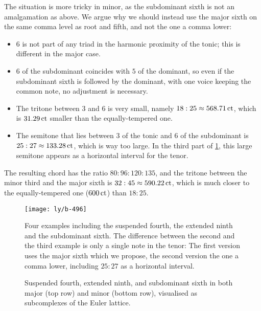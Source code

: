 \documentclass[british,11pt]{scrartcl}
\begin{document}
The situation is more tricky in minor, as the subdominant sixth is not an
amalgamation as above. We argue why we should instead use the major sixth
on the same comma level as root and fifth, and not the one a comma lower:
\begin{itemize}
\item \naturalm $6$ is not part of any triad in the harmonic proximity of the
  tonic; this is different in the major case.
\item \natural $6$ of the subdominant coincides with \natural $5$ of the
  dominant, so even
  if the subdominant sixth is followed by the dominant, with one voice keeping the 
  common note, no adjustment is necessary.
\item The tritone between \flatp $3$ and \naturalm $6$ is very small, namely
  $18:25\approx 568.71\,\mathrm{ct}$, which is $31.29\,\mathrm{ct}$ smaller than the
  equally-tempered one.
\item The semitone that lies between \flatp $3$ of the tonic and \naturalm $6$
  of the subdominant is $25:27\approx 133.28\,\mathrm{ct}$, which is way too
  large. In the third part of \cref{fig:496}, this large semitone appears as a
  horizontal interval for the tenor.
\end{itemize}
The resulting chord has the ratio $80:96:120:135$, and the tritone between the
minor third and the major sixth is $32:45\approx 590.22\,\mathrm{ct}$, which is much
closer to the equally-tempered one ($600\,\mathrm{ct}$) than $18:25$.

\begin{figure}
  \centering
  \texttt{[image: ly/b-496]}
  \caption{Four examples including the suspended fourth, the extended ninth and
    the subdominant sixth. The difference between the second and the third
    example is only a single note in the tenor: The first version uses the major
    sixth which we propose, the second version the one a comma lower, including
    $25:27$ as a horizontal interval.}\label{fig:496}
\end{figure}

\begin{figure}
  \centering
  
  \caption{Suspended fourth, extended ninth, and subdominant sixth in both major
    (top row) and minor (bottom row), visualised as subcomplexes of the Euler
    lattice.}\label{fig:chordLines}
\end{figure}
\end{document}
